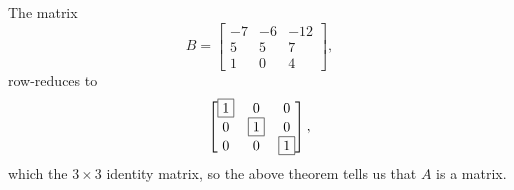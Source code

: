 \documentclass{ximera}
\begin{document}
\begin{example}
  The matrix
  \[
    B = \begin{bmatrix}
      -7&-6&- 12\\
      5&5&7 \\
      1&0&4
    \end{bmatrix},
  \]
  row-reduces to
  \[
    \begin{bmatrix}
      \fbox{1}&0&0 \\
      0&\fbox{1}&0 \\
      0&0&\fbox{1}
    \end{bmatrix},
  \]
  which  the $3\times 3$
  identity matrix, so the above theorem tells us that $A$ is a
   matrix.
\end{example}
\end{document}

